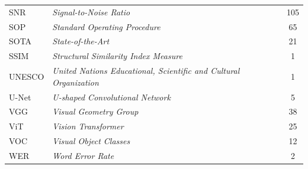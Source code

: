 \begin{longtable}{@{} l >{\raggedright\arraybackslash}p{7.5cm} c @{}}
SNR & \textit{Signal-to-Noise Ratio}  & 105 \\
SOP & \textit{Standard Operating Procedure}  & 65 \\
SOTA & \textit{State-of-the-Art} & 21 \\
SSIM & \textit{Structural Similarity Index Measure} & 1 \\
UNESCO & \textit{United Nations Educational, Scientific and Cultural Organization} & 1 \\
U-Net & \textit{U-shaped Convolutional Network} & 5 \\
VGG & \textit{Visual Geometry Group} & 38 \\
ViT & \textit{Vision Transformer} & 25 \\
VOC & \textit{Visual Object Classes} & 12 \\
WER & \textit{Word Error Rate} & 2 \\

\end{longtable}

\newpage


\label{subsec:daftar-lambang}
\vspace{0.8em}

